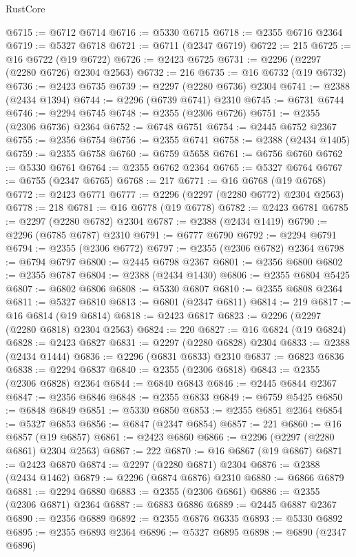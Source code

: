 \begin{lexlean}{RustCore}
\begin{coremodule}
@6715 := @6712 @6714
@6716 := @5330 @6715
@6718 := @2355 @6716 @2364
@6719 := @5327 @6718
@6721 := @6711 (@2347 @6719)
@6722 := 215
@6725 := @16 @6722 (@19 @6722)
@6726 := @2423 @6725
@6731 := @2296 (@2297 (@2280 @6726) @2304 @2563)
@6732 := 216
@6735 := @16 @6732 (@19 @6732)
@6736 := @2423 @6735
@6739 := @2297 (@2280 @6736) @2304
@6741 := @2388 (@2434 @1394)
@6744 := @2296 (@6739 @6741) @2310
@6745 := @6731 @6744
@6746 := @2294 @6745
@6748 := @2355 (@2306 @6726)
@6751 := @2355 (@2306 @6736) @2364
@6752 := @6748 @6751
@6754 := @2445 @6752 @2367
@6755 := @2356 @6754
@6756 := @2355 @6741
@6758 := @2388 (@2434 @1405)
@6759 := @2355 @6758
@6760 := @6759 @5658
@6761 := @6756 @6760
@6762 := @5330 @6761
@6764 := @2355 @6762 @2364
@6765 := @5327 @6764
@6767 := @6755 (@2347 @6765)
@6768 := 217
@6771 := @16 @6768 (@19 @6768)
@6772 := @2423 @6771
@6777 := @2296 (@2297 (@2280 @6772) @2304 @2563)
@6778 := 218
@6781 := @16 @6778 (@19 @6778)
@6782 := @2423 @6781
@6785 := @2297 (@2280 @6782) @2304
@6787 := @2388 (@2434 @1419)
@6790 := @2296 (@6785 @6787) @2310
@6791 := @6777 @6790
@6792 := @2294 @6791
@6794 := @2355 (@2306 @6772)
@6797 := @2355 (@2306 @6782) @2364
@6798 := @6794 @6797
@6800 := @2445 @6798 @2367
@6801 := @2356 @6800
@6802 := @2355 @6787
@6804 := @2388 (@2434 @1430)
@6806 := @2355 @6804 @5425
@6807 := @6802 @6806
@6808 := @5330 @6807
@6810 := @2355 @6808 @2364
@6811 := @5327 @6810
@6813 := @6801 (@2347 @6811)
@6814 := 219
@6817 := @16 @6814 (@19 @6814)
@6818 := @2423 @6817
@6823 := @2296 (@2297 (@2280 @6818) @2304 @2563)
@6824 := 220
@6827 := @16 @6824 (@19 @6824)
@6828 := @2423 @6827
@6831 := @2297 (@2280 @6828) @2304
@6833 := @2388 (@2434 @1444)
@6836 := @2296 (@6831 @6833) @2310
@6837 := @6823 @6836
@6838 := @2294 @6837
@6840 := @2355 (@2306 @6818)
@6843 := @2355 (@2306 @6828) @2364
@6844 := @6840 @6843
@6846 := @2445 @6844 @2367
@6847 := @2356 @6846
@6848 := @2355 @6833
@6849 := @6759 @5425
@6850 := @6848 @6849
@6851 := @5330 @6850
@6853 := @2355 @6851 @2364
@6854 := @5327 @6853
@6856 := @6847 (@2347 @6854)
@6857 := 221
@6860 := @16 @6857 (@19 @6857)
@6861 := @2423 @6860
@6866 := @2296 (@2297 (@2280 @6861) @2304 @2563)
@6867 := 222
@6870 := @16 @6867 (@19 @6867)
@6871 := @2423 @6870
@6874 := @2297 (@2280 @6871) @2304
@6876 := @2388 (@2434 @1462)
@6879 := @2296 (@6874 @6876) @2310
@6880 := @6866 @6879
@6881 := @2294 @6880
@6883 := @2355 (@2306 @6861)
@6886 := @2355 (@2306 @6871) @2364
@6887 := @6883 @6886
@6889 := @2445 @6887 @2367
@6890 := @2356 @6889
@6892 := @2355 @6876 @6335
@6893 := @5330 @6892
@6895 := @2355 @6893 @2364
@6896 := @5327 @6895
@6898 := @6890 (@2347 @6896)

\end{coremodule}
\end{lexlean}
